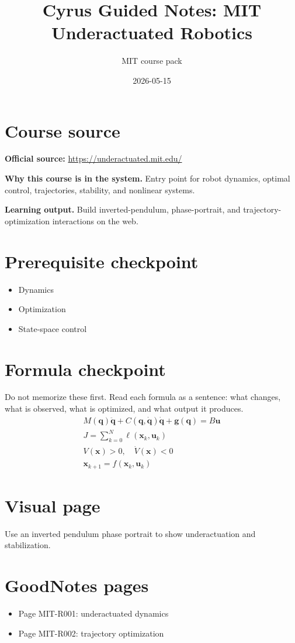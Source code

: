 \documentclass[11pt]{article}
\title{Cyrus Guided Notes: MIT Underactuated Robotics}
\author{MIT course pack}
\date{2026-05-15}
\begin{document}
\maketitle

\section*{Course source}
\textbf{Official source:} \url{https://underactuated.mit.edu/}

\textbf{Why this course is in the system.} Entry point for robot dynamics, optimal control, trajectories, stability, and nonlinear systems.

\textbf{Learning output.} Build inverted-pendulum, phase-portrait, and trajectory-optimization interactions on the web.

\section*{Prerequisite checkpoint}
\begin{itemize}[leftmargin=1.4em]
  \item Dynamics
  \item Optimization
  \item State-space control
\end{itemize}

\section*{Formula checkpoint}
Do not memorize these first. Read each formula as a sentence: what changes, what is observed, what is optimized, and what output it produces.
\begin{align*}
  M(\bm{q})\ddot{\bm{q}}+C(\bm{q},\dot{\bm{q}})\dot{\bm{q}}+\bm{g}(\bm{q})=B\bm{u}\\
  J=\sum_{k=0}^{N}\ell(\bm{x}_k,\bm{u}_k)\\
  V(\bm{x})>0,\quad \dot{V}(\bm{x})<0\\
  \bm{x}_{k+1}=f(\bm{x}_k,\bm{u}_k)
\end{align*}

\section*{Visual page}
Use an inverted pendulum phase portrait to show underactuation and stabilization.

\section*{GoodNotes pages}
\begin{itemize}[leftmargin=1.4em]
  \item Page MIT-R001: underactuated dynamics
  \item Page MIT-R002: trajectory optimization
\end{itemize}
\end{document}
